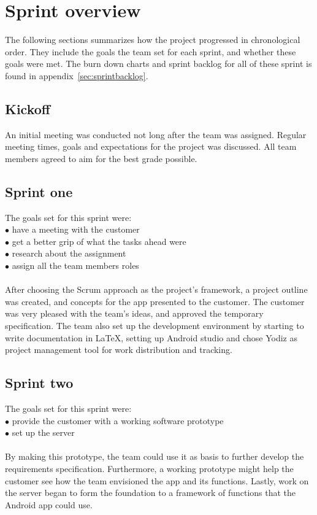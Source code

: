 \newpage
\section{Sprint overview}
\label{sec:sprintOverview}
The following sections summarizes how the project progressed in chronological order. They include the goals the team set for each sprint, and whether these goals were met. The burn down charts and sprint backlog for all of these sprint is found in appendix~\ref{sec:sprintbacklog}.

\subsection{Kickoff}
An initial meeting was conducted not long after the team was assigned. Regular meeting times, goals and expectations for the project was discussed. All team members agreed to aim for the best grade possible.

\subsection{Sprint one}
The goals set for this sprint were:\\
$\bullet$\hspace{0.25cm} have a meeting with the customer\\
$\bullet$\hspace{0.25cm} get a better grip of what the tasks ahead were\\
$\bullet$\hspace{0.25cm} research about the assignment\\
$\bullet$\hspace{0.25cm} assign all the team members roles\\\\
After choosing the Scrum approach as the project's framework, a project outline was created, and concepts for the app presented to the customer. The customer was very pleased with the team's ideas, and approved the temporary specification. The team also set up the development environment by starting to write documentation in \LaTeX, setting up Android studio and chose Yodiz as project management tool for work distribution and tracking.

\subsection{Sprint two}
The goals set for this sprint were:\\
$\bullet$\hspace{0.25cm} provide the customer with a working software prototype\\
$\bullet$\hspace{0.25cm} set up the server\\\\
By making this prototype, the team could use it as basis to further develop the requirements specification. Furthermore, a working prototype might help the customer see how the team envisioned the app and its functions. Lastly, work on the server began to form the foundation to a framework of functions that the Android app could use. 

